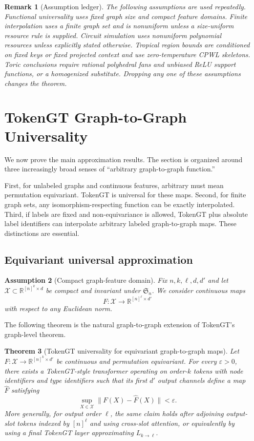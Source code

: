 \documentclass[11pt]{article}
\newtheorem{theorem}{Theorem}[section]
\newtheorem{assumption}[theorem]{Assumption}
\newtheorem{remark}[theorem]{Remark}
\newcommand{\R}{\mathbb{R}}
\newcommand{\Sn}{\mathfrak{S}_n}
\newcommand{\cX}{\mathcal{X}}
\newcommand{\eps}{\varepsilon}
\begin{document}
\begin{remark}[Assumption ledger]
The following assumptions are used repeatedly.  Functional universality uses fixed graph size and compact feature domains.  Finite interpolation uses a finite graph set and is nonuniform unless a size-uniform resource rule is supplied.  Circuit simulation uses nonuniform polynomial resources unless explicitly stated otherwise.  Tropical region bounds are conditioned on fixed keys or fixed projected context and use zero-temperature CPWL skeletons.  Toric conclusions require rational polyhedral fans and unbiased ReLU support functions, or a homogenized substitute.  Dropping any one of these assumptions changes the theorem.
\end{remark}

\section{TokenGT Graph-to-Graph Universality}
\label{sec:universality}

We now prove the main approximation results.  The section is organized around three increasingly broad senses of ``arbitrary graph-to-graph function.''

First, for unlabeled graphs and continuous features, arbitrary must mean permutation equivariant.  TokenGT is universal for these maps.  Second, for finite graph sets, any isomorphism-respecting function can be exactly interpolated.  Third, if labels are fixed and non-equivariance is allowed, TokenGT plus absolute label identifiers can interpolate arbitrary labeled graph-to-graph maps.  These distinctions are essential.

\subsection{Equivariant universal approximation}

\begin{assumption}[Compact graph-feature domain]
Fix $n,k,\ell,d,d'$ and let $\cX\subset \R^{[n]^k\times d}$ be compact and invariant under $\Sn$.  We consider continuous maps
\[
  F:\cX\to \R^{[n]^\ell\times d'}
\]
with respect to any Euclidean norm.
\end{assumption}

The following theorem is the natural graph-to-graph extension of TokenGT's graph-level theorem.

\begin{theorem}[TokenGT universality for equivariant graph-to-graph maps]
\label{thm:eq-univ}
Let $F:\cX\to \R^{[n]^k\times d'}$ be continuous and permutation equivariant.  For every $\eps>0$, there exists a TokenGT-style transformer operating on order-$k$ tokens with node identifiers and type identifiers such that its first $d'$ output channels define a map $\widehat F$ satisfying
\[
  \sup_{X\in \cX}\|F(X)-\widehat F(X)\|<\eps .
\]
More generally, for output order $\ell$, the same claim holds after adjoining output-slot tokens indexed by $[n]^\ell$ and using cross-slot attention, or equivalently by using a final TokenGT layer approximating $L_{k\to \ell}$.
\end{theorem}
\end{document}
